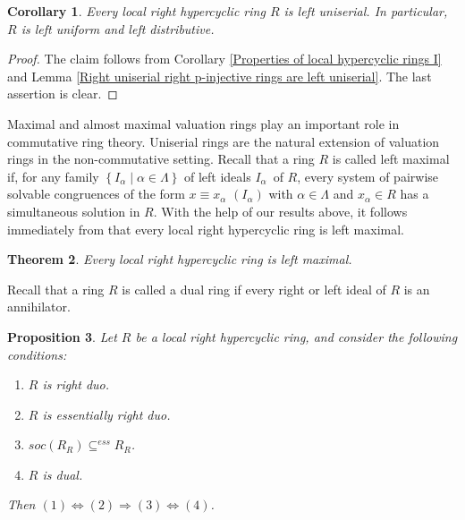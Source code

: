 \documentclass{amsart}
\newtheorem{theorem}{Theorem}[section]
\theoremstyle{plain}
\newtheorem{corollary}[theorem]{Corollary}
\newtheorem{proposition}[theorem]{Proposition}
\numberwithin{equation}{section}
\begin{document}
\begin{corollary}
\label{Properties of local hypercyclic rings II}
Every local right hypercyclic ring $R$ is left uniserial. In particular, $R$ is left uniform and left distributive. 
\end{corollary}


\begin{proof}
The claim follows from Corollary \ref{Properties of local hypercyclic rings I}
and Lemma \ref{Right uniserial right p-injective rings are left uniserial}.
The last assertion is clear. 
\end{proof}

Maximal and almost maximal valuation rings play an important role in commutative ring theory.
Uniserial rings are the natural extension of valuation rings in the non-commutative setting. Recall that a ring $R$ is called left maximal if, for any family $\left \{I_{\alpha } \mid \alpha  \in \Lambda \right \}$ of left ideals $I_{\alpha }$\ of $R$, every system of pairwise solvable congruences of the form $x \equiv x_{\alpha }$ $(I_{\alpha })$ with $\alpha  \in \Lambda $ and $x_{\alpha } \in R$ has a simultaneous solution in $R$.  With the help of our results above, it follows immediately from \cite[Theorem 9]{AS} that every local right hypercyclic ring is left maximal. 


\begin{theorem}
Every local right hypercyclic ring is left maximal. 
\end{theorem}

Recall that a ring $R$ is called a dual ring \cite{HN} if every right or left
ideal of $R$ is an annihilator. 


\begin{proposition}
\label{Local hypercyclic rings with ess socle are dual rings}
Let $R$ be a local right hypercyclic ring, and consider the following conditions: 


\begin{enumerate}
\item $R$ is right duo. 

\item $R$ is essentially right duo. 

\item $s o c (R_{R})  \subseteq ^{e s s}R_{R}$. 

\item $R$ is dual. \end{enumerate}


Then $(1) \Leftrightarrow (2) \Rightarrow (3) \Leftrightarrow (4)$. 
\end{proposition}
\end{document}
